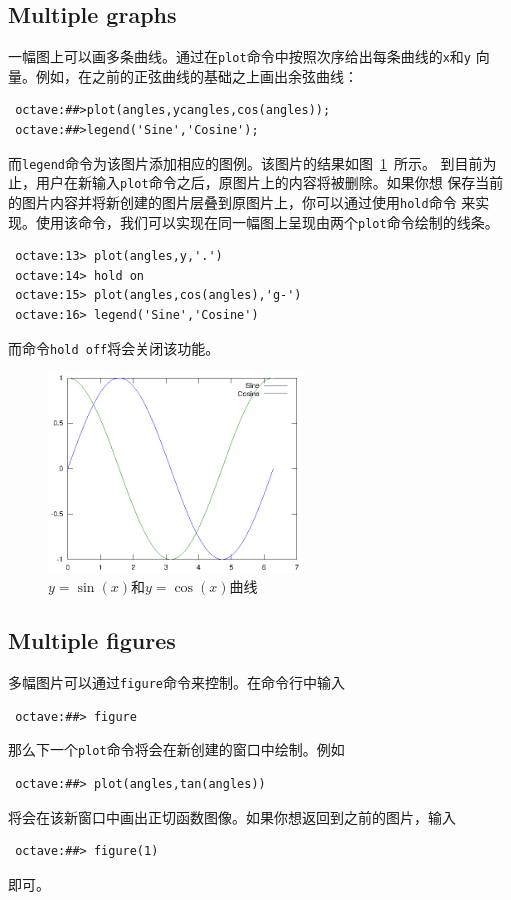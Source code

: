 \documentclass[UTF8,adobefonts]{ctexart}
\begin{document}
\subsection{Multiple graphs}
一幅图上可以画多条曲线。通过在{\tt plot}命令中按照次序给出每条曲线的{\tt x}和{\tt y}
向量。例如，在之前的正弦曲线的基础之上画出余弦曲线：
\begin{verbatim}
 octave:##>plot(angles,ycangles,cos(angles));
 octave:##>legend('Sine','Cosine');
\end{verbatim}
而{\tt legend}命令为该图片添加相应的图例。该图片的结果如图~\ref{sinandcos}~所示。
到目前为止，用户在新输入{\tt plot}命令之后，原图片上的内容将被删除。如果你想
保存当前的图片内容并将新创建的图片层叠到原图片上，你可以通过使用{\tt hold}命令
来实现。使用该命令，我们可以实现在同一幅图上呈现由两个{\tt plot}命令绘制的线条。
\begin{verbatim}
 octave:13> plot(angles,y,'.')
 octave:14> hold on
 octave:15> plot(angles,cos(angles),'g-')
 octave:16> legend('Sine','Cosine')
\end{verbatim}
而命令{\tt hold off}将会关闭该功能。
\begin{figure}
 \centering
 \includegraphics[width=0.6\textwidth]{sinandcos.eps}
 \caption{$y=\sin(x)$和$y=\cos (x)$曲线}
 \label{sinandcos}
\end{figure}
\subsection{Multiple figures}
 多幅图片可以通过{\tt figure}命令来控制。在命令行中输入
\begin{verbatim}
 octave:##> figure
\end{verbatim}
那么下一个{\tt plot}命令将会在新创建的窗口中绘制。例如
\begin{verbatim}
 octave:##> plot(angles,tan(angles))
\end{verbatim}
将会在该新窗口中画出正切函数图像。如果你想返回到之前的图片，输入
\begin{verbatim}
 octave:##> figure(1)
\end{verbatim}
即可。
\end{document}
